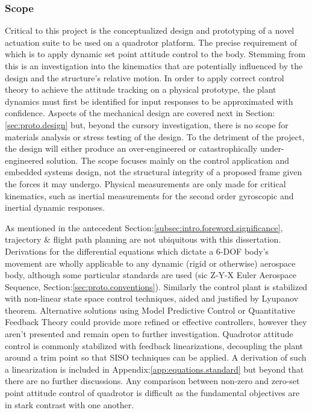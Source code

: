 \subsubsection{Scope}
\label{subsubsec:intro.foreword.scope}
Critical to this project is the conceptualized design and prototyping of a novel actuation suite to be used on a quadrotor platform. The precise requirement of which is to apply dynamic set point attitude control to the body. Stemming from this is an investigation into the kinematics that are potentially influenced by the design and the structure's relative motion. In order to apply correct control theory to achieve the attitude tracking on a physical prototype, the plant dynamics must first be identified for input responses to be approximated with confidence. Aspects of the mechanical design are covered next in Section:\ref{sec:proto.design} but, beyond the cursory investigation, there is no scope for materials analysis or stress testing of the design. To the detriment of the project, the design will either produce an over-engineered or catastrophically under-engineered solution. The scope focuses mainly on the control application and embedded systems design, not the structural integrity of a proposed frame given the forces it may undergo. Physical measurements are only made for critical kinematics, such as inertial measurements for the second order gyroscopic and inertial dynamic responses.
\par
As mentioned in the antecedent Section:\ref{subsec:intro.foreword.significance}, trajectory \& flight path planning are not ubiquitous with this dissertation. Derivations for the differential equations which dictate a 6-DOF body's movement are wholly applicable to any dynamic (rigid or otherwise) aerospace body, although some particular standards are used (sic Z-Y-X Euler Aerospace Sequence, Section:\ref{sec:proto.conventions}). Similarly the control plant is stabilized with non-linear state space control techniques, aided and justified by Lyupanov theorem. Alternative solutions using Model Predictive Control or Quantitative Feedback Theory could provide more refined or effective controllers, however they aren't presented and remain open to further investigation. Quadrotor attitude control is commonly stabilized with feedback linearizations, decoupling the plant around a trim point so that SISO techniques can be applied. A derivation of such a linearization is included in Appendix:\ref{app:equations.standard} but beyond that there are no further discussions. Any comparison between non-zero and zero-set point attitude control of quadrotor is difficult as the fundamental objectives are in stark contrast with one another.

